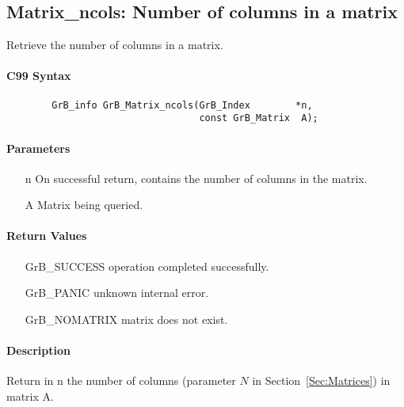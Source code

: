 \subsection{{\sf Matrix\_ncols}: Number of columns in a matrix}

Retrieve the number of columns in a matrix.

\paragraph{C99 Syntax}

\begin{verbatim}
        GrB_info GrB_Matrix_ncols(GrB_Index        *n,
                                  const GrB_Matrix  A);
\end{verbatim}

\paragraph{Parameters}

\begin{itemize}[leftmargin=1.1in]
    \item[{\sf n}] On successful return, contains the number of columns in the matrix.
    \item[{\sf A}] Matrix being queried.
\end{itemize}

\paragraph{Return Values}

\begin{itemize}[leftmargin=2.1in]
\item[{\sf GrB\_SUCCESS}]   operation completed successfully.
\item[{\sf GrB\_PANIC}]     unknown internal error.
\item[{\sf GrB\_NOMATRIX}]  matrix does not exist.
\end{itemize}

\paragraph{Description}

Return in {\sf n} the number of columns (parameter $N$ in Section~\ref{Sec:Matrices}) in matrix {\sf A}.

